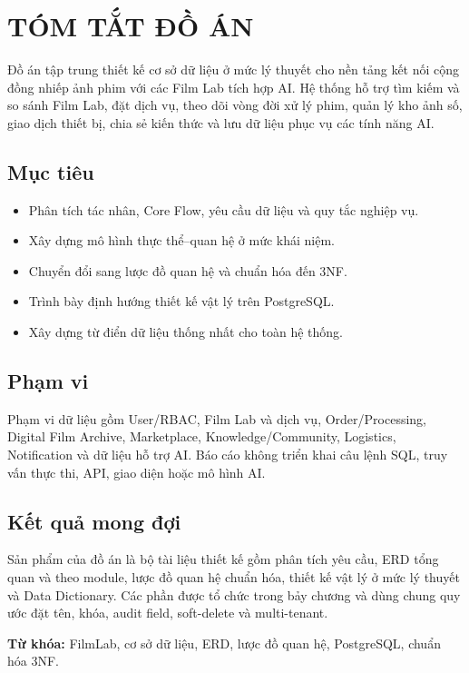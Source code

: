 \chapter*{TÓM TẮT ĐỒ ÁN}

Đồ án tập trung thiết kế cơ sở dữ liệu ở mức lý thuyết cho nền tảng kết nối cộng đồng nhiếp ảnh phim với các Film Lab tích hợp AI. Hệ thống hỗ trợ tìm kiếm và so sánh Film Lab, đặt dịch vụ, theo dõi vòng đời xử lý phim, quản lý kho ảnh số, giao dịch thiết bị, chia sẻ kiến thức và lưu dữ liệu phục vụ các tính năng AI.

\section*{Mục tiêu}

\begin{itemize}
    \item Phân tích tác nhân, Core Flow, yêu cầu dữ liệu và quy tắc nghiệp vụ.
    \item Xây dựng mô hình thực thể--quan hệ ở mức khái niệm.
    \item Chuyển đổi sang lược đồ quan hệ và chuẩn hóa đến 3NF.
    \item Trình bày định hướng thiết kế vật lý trên PostgreSQL.
    \item Xây dựng từ điển dữ liệu thống nhất cho toàn hệ thống.
\end{itemize}

\section*{Phạm vi}

Phạm vi dữ liệu gồm User/RBAC, Film Lab và dịch vụ, Order/Processing, Digital Film Archive, Marketplace, Knowledge/Community, Logistics, Notification và dữ liệu hỗ trợ AI. Báo cáo không triển khai câu lệnh SQL, truy vấn thực thi, API, giao diện hoặc mô hình AI.

\section*{Kết quả mong đợi}

Sản phẩm của đồ án là bộ tài liệu thiết kế gồm phân tích yêu cầu, ERD tổng quan và theo module, lược đồ quan hệ chuẩn hóa, thiết kế vật lý ở mức lý thuyết và Data Dictionary. Các phần được tổ chức trong bảy chương và dùng chung quy ước đặt tên, khóa, audit field, soft-delete và multi-tenant.

\textbf{Từ khóa:} FilmLab, cơ sở dữ liệu, ERD, lược đồ quan hệ, PostgreSQL, chuẩn hóa 3NF.
